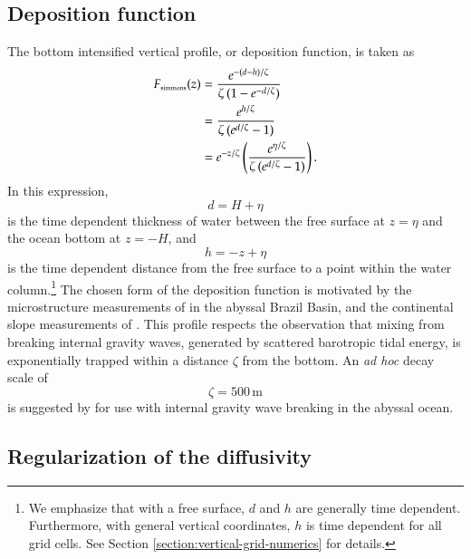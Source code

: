 \subsection{Deposition function}

The bottom intensified vertical profile, or deposition function, is
taken as
\begin{subequations}
\begin{align}
  F_{\mbox{\tiny simmons}}(z) &= \frac{e^{-(d-h)/\zeta}}{\zeta \, (1 - e^{-d/\zeta} )}
  \\
  &= \frac{e^{h/\zeta}}{\zeta \, (e^{d/\zeta}-1)}
 \\
  &= e^{-z/\zeta} \left( \frac{ e^{\eta/\zeta} }{ \zeta \, ( e^{d/\zeta} - 1 ) } \right).
\end{align}
\label{eq:simmons-vertical-function}
\end{subequations}
 In this expression,
\begin{equation}
  d = H + \eta
\end{equation}
is the time dependent thickness of water between the free surface at
$z=\eta$ and the ocean bottom at $z=-H$, and
\begin{equation}
  h=-z+\eta
\end{equation}
is the time dependent distance from the free surface to a point within
the water column.\footnote{We emphasize that with a free surface, $d$
  and $h$ are generally time dependent.  Furthermore, with general
  vertical coordinates, $h$ is time dependent for all grid cells.  See
  Section \ref{section:vertical-grid-numerics} for details.}  The
chosen form of the deposition function is motivated by the
microstructure measurements of \cite{StLaurent_etal2001} in the
abyssal Brazil Basin, and the continental slope measurements of
\cite{Moum_etal2002}.  This profile respects the observation that
mixing from breaking internal gravity waves, generated by scattered
barotropic tidal energy, is exponentially trapped within a distance
$\zeta$ from the bottom.  An {\em ad hoc} decay scale of
\begin{equation}
  \zeta = 500 \, \mbox{m}
\end{equation}
is suggested by \cite{Simmonsetal2004} for use with internal gravity
wave breaking in the abyssal ocean.


\subsection{Regularization of the diffusivity}


